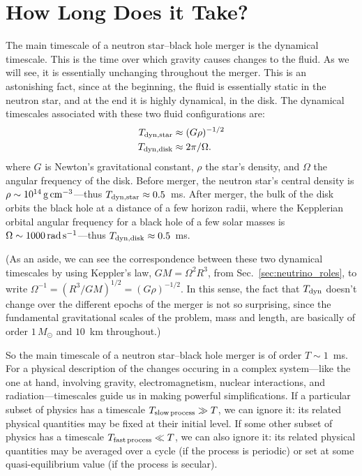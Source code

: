 \section{How Long Does it Take?}
\label{sec:timescales}
The main timescale of a neutron star--black hole merger is the dynamical
timescale. This is the time over which gravity causes changes to the fluid.
As we will see, it is essentially unchanging throughout the merger.
This is an astonishing fact, since at the beginning, the fluid is essentially
static in the neutron star, and at the end it is highly dynamical, in the disk.
The dynamical timescales associated with these two fluid configurations are:
\begin{align}
  T_{\rm dyn,star} &\approx (G\rho)^{-1/2} \nonumber \\
  T_{\rm dyn,disk} &\approx 2\pi/\Omega. \nonumber
\end{align}
where $G$ is Newton's gravitational constant, $\rho$ the star's density,
and $\Omega$ the angular frequency of the disk.
Before merger, the neutron star's central density is
$\rho\sim10^{14}\,{\rm g\,cm}^{-3}$---thus $T_{\rm dyn,star}\approx0.5$~ms.
After merger, the bulk of the disk orbits the black hole at a distance of
a few horizon radii, where the Kepplerian orbital angular frequency for a black
hole of a few solar masses is
$\Omega\sim1000\,{\rm rad\,s^{-1}}$---thus $T_{\rm dyn,disk}\approx0.5$~ms.

(As an aside, we can see the correspondence between these two dynamical
timescales by using Keppler's law, $GM=\Omega^2 R^3$, from
Sec.~\ref{sec:neutrino_roles},
to write $\Omega^{-1}=(R^3/GM)^{1/2}=(G\rho)^{-1/2}$.
In this sense, the fact that $T_{\rm dyn}$ doesn't change over the different
epochs of the merger is not so surprising, since the fundamental gravitational
scales of the problem, mass and length, are basically of order $1\,M_\odot$
and $10$~km throughout.)

So the main timescale of a neutron star--black hole merger is of order
$T\sim1$~ms.
For a physical description of the changes occuring in a complex system---like
the one at hand, involving gravity, electromagnetism, nuclear interactions, and
radiation---timescales guide us in making powerful simplifications.
If a particular subset of physics has a timescale
$T_{\rm slow\, process}\gg T$, we can ignore it:
its related physical quantities may be fixed at their initial level.
If some other subset of physics has a timescale
$T_{\rm fast\, process}\ll T$, we can also ignore it:
its related physical quantities may be averaged over a cycle (if the process
is periodic) or set at some quasi-equilibrium value (if the process is secular).

